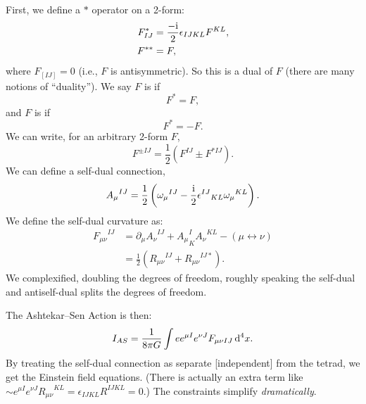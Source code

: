 First, we define a $*$ operator on a 2-form:
\begin{subequations}
\begin{align}
F^{*}_{IJ} &= \frac{-\mathrm{i}}{2}\epsilon_{IJKL}F^{KL},\\
F^{**} &= F,
\end{align}
\end{subequations}
where $F_{[IJ]}=0$ (i.e., $F$ is antisymmetric). So this is a dual of
$F$ (there are many notions of ``duality''). We say $F$ is
 if
\begin{equation}
F^{*}=F,
\end{equation}
and $F$ is  if
\begin{equation}
F^{*}=-F.
\end{equation}
We can write, for an arbitrary 2-form $F$,
\begin{equation}
F^{\pm IJ} = \frac{1}{2}\left(F^{IJ}\pm F^{* IJ}\right).
\end{equation}
We can define a self-dual connection,
\begin{equation}
{A_{\mu}}^{IJ} = \frac{1}{2}\left({\omega_{\mu}}^{IJ} - \frac{\mathrm{i}}{2}{\epsilon^{IJ}}_{KL}{\omega_{\mu}}^{KL}\right).
\end{equation}
We define the self-dual curvature as:
\begin{subequations}
\begin{align}
{F_{\mu\nu}}^{IJ}
&= \partial_{\mu}{A_{\nu}}^{IJ} + {A_{\mu}}^{I}_{K}{A_{\nu}}^{KL} - (\mu\leftrightarrow\nu)\\
&= \frac{1}{2}({R_{\mu\nu}}^{IJ} + {R_{\mu\nu}}^{IJ*}).
\end{align}
\end{subequations}
We complexified, doubling the degrees of freedom, roughly speaking the
self-dual and antiself-dual splits the degrees of freedom.

The Ashtekar--Sen Action is then:
\begin{equation}
I_{AS} = \frac{1}{8\pi G}\int e e^{\mu I}e^{\nu J}F_{\mu\nu IJ}\,\mathrm{d}^{4}x.
\end{equation}
By treating the self-dual connection as separate [independent] from the
tetrad, we get the Einstein field equations. (There is actually an extra
term like $\sim e^{\mu I}e^{\nu J}{R_{\mu\nu}}^{KL} = \epsilon_{IJKL}R^{IJKL}=0$.)
The constraints simplify \emph{dramatically}.

